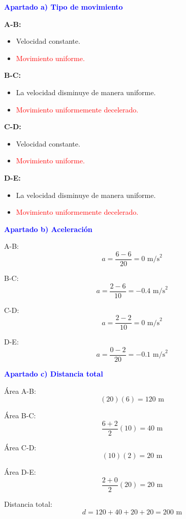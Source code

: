 \begin{exercise}
\begin{solu}
    \textbf{\textcolor{blue}{Apartado a) Tipo de movimiento}}

    \textbf{A-B:}
    \begin{itemize}
        \item Velocidad constante.
        \item \textcolor{red}{Movimiento uniforme.}
    \end{itemize}

    \textbf{B-C:}
    \begin{itemize}
        \item La velocidad disminuye de manera uniforme.
        \item \textcolor{red}{Movimiento uniformemente decelerado.}
    \end{itemize}

    \textbf{C-D:}
    \begin{itemize}
        \item Velocidad constante.
        \item \textcolor{red}{Movimiento uniforme.}
    \end{itemize}

    \textbf{D-E:}
    \begin{itemize}
        \item La velocidad disminuye de manera uniforme.
        \item \textcolor{red}{Movimiento uniformemente decelerado.}
    \end{itemize}

    \textbf{\textcolor{blue}{Apartado b) Aceleración}}

    A-B:
    \[
    a=\frac{6-6}{20}=0\text{ m/s}^2
    \]

    B-C:
    \[
    a=\frac{2-6}{10}=-0.4\text{ m/s}^2
    \]

    C-D:
    \[
    a=\frac{2-2}{10}=0\text{ m/s}^2
    \]

    D-E:
    \[
    a=\frac{0-2}{20}=-0.1\text{ m/s}^2
    \]

    \textbf{\textcolor{blue}{Apartado c) Distancia total}}

    Área A-B:
    \[
    (20)(6)=120\text{ m}
    \]

    Área B-C:
    \[
    \frac{6+2}{2}(10)=40\text{ m}
    \]

    Área C-D:
    \[
    (10)(2)=20\text{ m}
    \]

    Área D-E:
    \[
    \frac{2+0}{2}(20)=20\text{ m}
    \]

    Distancia total:
    \[
    d=120+40+20+20=\boxed{200\text{ m}}
    \]

    \end{solu}
\end{exercise}

